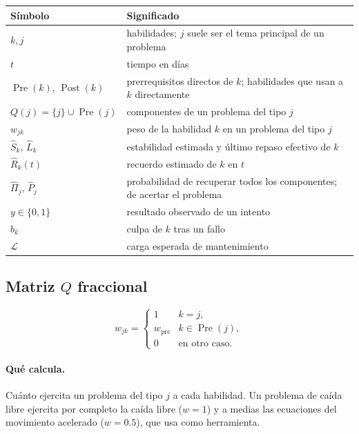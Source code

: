 \documentclass[11pt]{article}
\theoremstyle{definition}
\theoremstyle{remark}
\newcommand{\Pre}{\operatorname{Pre}}
\newcommand{\Post}{\operatorname{Post}}
\newcommand{\Rh}{\hat R}
\newcommand{\Sh}{\hat S}
\newcommand{\Lh}{\hat L}
\newcommand{\Pih}{\hat\Pi}
\newcommand{\Carga}{\mathcal L}
\begin{document}
\begin{center}\small
\begin{tabular}{@{}ll@{}}
\toprule
Símbolo & Significado \\
\midrule
$k,j$ & habilidades; $j$ suele ser el tema principal de un problema \\
$t$ & tiempo en días \\
$\Pre(k)$, $\Post(k)$ & prerrequisitos directos de $k$; habilidades que usan a $k$ directamente \\
$Q(j)=\{j\}\cup\Pre(j)$ & componentes de un problema del tipo $j$ \\
$w_{jk}$ & peso de la habilidad $k$ en un problema del tipo $j$ \\
$\Sh_k$, $\Lh_k$ & estabilidad estimada y último repaso efectivo de $k$ \\
$\Rh_k(t)$ & recuerdo estimado de $k$ en $t$ \\
$\Pih_j$, $\hat P_j$ & probabilidad de recuperar todos los componentes; de acertar el problema \\
$y\in\{0,1\}$ & resultado observado de un intento \\
$b_k$ & culpa de $k$ tras un fallo \\
$\Carga$ & carga esperada de mantenimiento \\
\bottomrule
\end{tabular}
\end{center}

\subsection{Matriz \texorpdfstring{$Q$}{Q} fraccional}

\begin{equation}
w_{jk}=\begin{cases}1 & k=j,\\ w_{\mathrm{pre}} & k\in\Pre(j),\\ 0 & \text{en otro caso.}\end{cases}
\label{eq:pesos}
\end{equation}

\paragraph{Qué calcula.} Cuánto ejercita un problema del tipo $j$ a cada habilidad. Un problema de caída libre ejercita por completo la caída libre ($w=1$) y a medias las ecuaciones del movimiento acelerado ($w=0.5$), que usa como herramienta.
\end{document}
